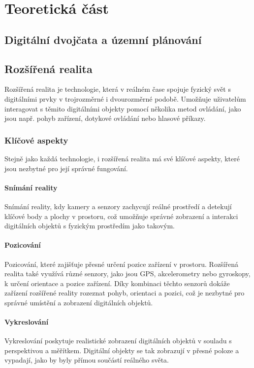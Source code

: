 \chapter{Teoretická část}
\section{Digitální dvojčata a územní plánování}
\section{Rozšířená realita}
Rozšířená realita je technologie, která v reálném čase spojuje fyzický svět s digitálními prvky v trojrozměrné i dvourozměrné podobě. Umožňuje uživatelům interagovat s těmito digitálními objekty pomocí několika metod ovládání, jako jsou např. pohyb zařízení, dotykové ovládání nebo hlasové příkazy. \cite{AROverview}
\subsection{Klíčové aspekty}
Stejně jako každá technologie, i rozšířená realita má své klíčové aspekty, které jsou nezbytné pro její správné fungování.
\subsubsection{Snímání reality}
Snímání reality, kdy kamery a senzory zachycují reálné prostředí a detekují klíčové body a plochy v prostoru, což umožňuje správné zobrazení a interakci digitálních objektů s fyzickým prostředím jako takovým. \cite{AROverview}
\subsubsection{Pozicování}
Pozicování, které zajišťuje přesné určení pozice zařízení v prostoru. Rozšířená realita také využívá různé senzory, jako jsou GPS, akcelerometry nebo gyroskopy, k určení orientace a pozice zařízení. Díky kombinaci těchto senzorů dokáže zařízení rozšířené reality rozeznat pohyb, orientaci a pozici, což je nezbytné pro správné umístění a zobrazení digitálních objektů. \cite{AROverview}
\subsubsection{Vykreslování}
Vykreslování poskytuje realistické zobrazení digitálních objektů v souladu s perspektivou a měřítkem. Digitální objekty se tak zobrazují v přesné poloze a vypadají, jako by byly přímou součástí reálného světa. \cite{AROverview} \\
